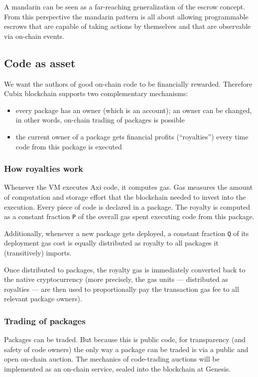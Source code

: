 \documentclass[a4paper]{article}
\newcommand{\code}[1]{{\small \texttt{#1}}}
\begin{document}
A mandarin can be seen as a far-reaching generalization of the escrow concept. From this perspective the mandarin pattern is all about allowing programmable escrows that are capable of taking actions by themselves and that are observable via on-chain events.

\subsection{Code as asset}

We want the authors of good on-chain code to be financially rewarded. Therefore Cubix blockchain supports two complementary mechanisms:

\begin{itemize}
  \item every package has an owner (which is an account); an owner can be changed, in other words, on-chain trading of packages is possible
  \item the current owner of a package gets financial profits (``royalties'') every time code from this package is executed
\end{itemize}

\subsubsection{How royalties work}

Whenever the VM executes Axi code, it computes gas. Gas measures the amount of computation and storage effort that the blockchain needed to invest into the execution. Every piece of code is declared in a package. The royalty is computed as a constant fraction \code{P} of the overall gas spent executing code from this package.

Additionally, whenever a new package gets deployed, a constant fraction \code{Q} of its deployment gas cost is equally distributed as royalty to all packages it (transitively) imports.

Once distributed to packages, the royalty gas is immediately converted back to the native cryptocurrency (more precisely, the gas units --- distributed as royalties --- are then used to proportionally pay the transaction gas fee to all relevant package owners).

\subsubsection{Trading of packages}

Packages can be traded. But because this is public code, for transparency (and safety of code owners) the only way a package can be traded is via a public and open on-chain auction. The mechanics of code-trading auctions will be implemented as an on-chain service, sealed into the blockchain at Genesis.
\end{document}
